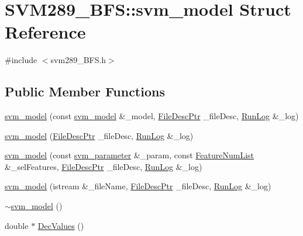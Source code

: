 \hypertarget{struct_s_v_m289___b_f_s_1_1svm__model}{}\section{S\+V\+M289\+\_\+\+B\+FS\+:\+:svm\+\_\+model Struct Reference}
\label{struct_s_v_m289___b_f_s_1_1svm__model}


{\ttfamily \#include $<$svm289\+\_\+\+B\+F\+S.\+h$>$}

\subsection*{Public Member Functions}
\begin{DoxyCompactItemize}
\item 
\hyperlink{struct_s_v_m289___b_f_s_1_1svm__model_a6e6d311ad438ef20bf655329099c6110}{svm\+\_\+model} (const \hyperlink{struct_s_v_m289___b_f_s_1_1svm__model}{svm\+\_\+model} \&\+\_\+model, \hyperlink{namespace_k_k_m_l_l_aa0d0b6ab4ec18868a399b8455b05d914}{File\+Desc\+Ptr} \+\_\+file\+Desc, \hyperlink{class_k_k_b_1_1_run_log}{Run\+Log} \&\+\_\+log)
\item 
\hyperlink{struct_s_v_m289___b_f_s_1_1svm__model_ac2edc71e898a412dcb597eec3c24e974}{svm\+\_\+model} (\hyperlink{namespace_k_k_m_l_l_aa0d0b6ab4ec18868a399b8455b05d914}{File\+Desc\+Ptr} \+\_\+file\+Desc, \hyperlink{class_k_k_b_1_1_run_log}{Run\+Log} \&\+\_\+log)
\item 
\hyperlink{struct_s_v_m289___b_f_s_1_1svm__model_aa9f326fdfd17e68f68f84e89be7c0495}{svm\+\_\+model} (const \hyperlink{struct_s_v_m289___b_f_s_1_1svm__parameter}{svm\+\_\+parameter} \&\+\_\+param, const \hyperlink{class_k_k_m_l_l_1_1_feature_num_list}{Feature\+Num\+List} \&\+\_\+sel\+Features, \hyperlink{namespace_k_k_m_l_l_aa0d0b6ab4ec18868a399b8455b05d914}{File\+Desc\+Ptr} \+\_\+file\+Desc, \hyperlink{class_k_k_b_1_1_run_log}{Run\+Log} \&\+\_\+log)
\item 
\hyperlink{struct_s_v_m289___b_f_s_1_1svm__model_a5390deb38d4188de96d9b66f5c6b5db2}{svm\+\_\+model} (istream \&\+\_\+file\+Name, \hyperlink{namespace_k_k_m_l_l_aa0d0b6ab4ec18868a399b8455b05d914}{File\+Desc\+Ptr} \+\_\+file\+Desc, \hyperlink{class_k_k_b_1_1_run_log}{Run\+Log} \&\+\_\+log)
\item 
\hyperlink{struct_s_v_m289___b_f_s_1_1svm__model_a901b9c7ca01fb7d381c0481c03dbedf5}{$\sim$svm\+\_\+model} ()
\item 
double $\ast$ \hyperlink{struct_s_v_m289___b_f_s_1_1svm__model_affd0675653fce95d5a8ac63aef14f8c9}{Dec\+Values} ()

\end{DoxyCompactItemize}
